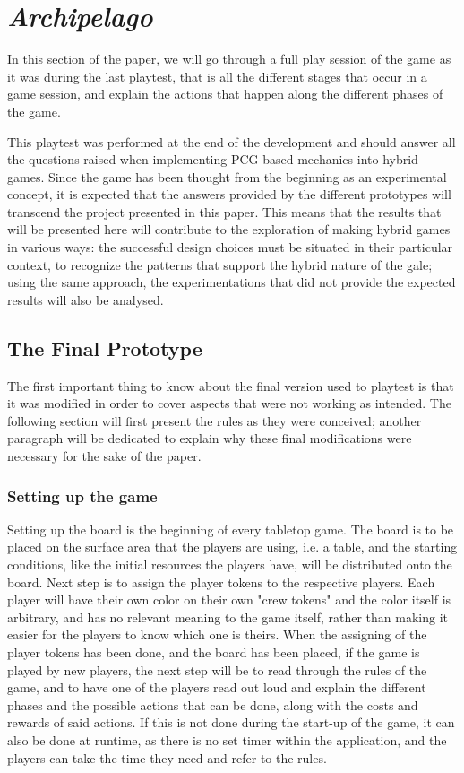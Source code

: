 \chapter{\textit{Archipelago}}
In this section of the paper, we will go through a full play session of the game as it was during the last playtest, that is all the different stages that occur in a game session, and explain the actions that happen along the different phases of the game.

This playtest was performed at the end of the development and should answer all the questions raised when implementing PCG-based mechanics into hybrid games. Since the game has been thought from the beginning as an experimental concept, it is expected that the answers provided by the different prototypes will transcend the project presented in this paper. This means that the results that will be presented here will contribute to the exploration of making hybrid games in various ways: the successful design choices must be situated in their particular context, to recognize the patterns that support the hybrid nature of the gale; using the same approach, the experimentations that did not provide the expected results will also be analysed.
\section{The Final Prototype}
\label{sec:finalproto}
The first important thing to know about the final version used to playtest is that it was modified in order to cover aspects that were not working as intended. The following section will first present the rules as they were conceived; another paragraph will be dedicated to explain why these final modifications were necessary for the sake of the paper.

\subsection{Setting up the game}
Setting up the board is the beginning of every tabletop game. The board is to be placed on the surface area that the players are using, i.e. a table, and the starting conditions, like the initial resources the players have, will be distributed onto the board. Next step is to assign the player tokens to the respective players. Each player will have their own color on their own "crew tokens" and the color itself is arbitrary, and has no relevant meaning to the game itself, rather than making it easier for the players to know which one is theirs.
When the assigning of the player tokens has been done, and the board has been placed, if the game is played by new players, the next step will be to read through the rules of the game, and to have one of the players read out loud and explain the different phases and the possible actions that can be done, along with the costs and rewards of said actions. If this is not done during the start-up of the game, it can also be done at runtime, as there is no set timer within the application, and the players can take the time they need and refer to the rules.
